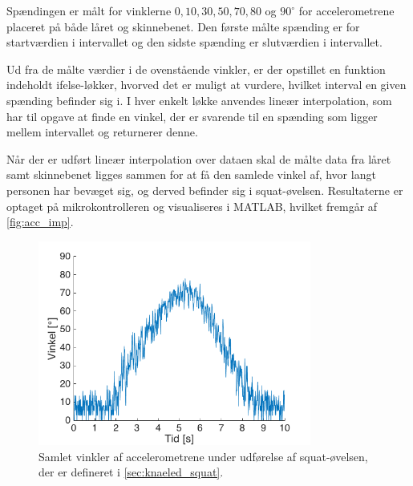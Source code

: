\noindent
Spændingen er målt for vinklerne $0, 10, 30, 50,70, 80$ og $90^{\circ}$ for accelerometrene placeret på både låret og skinnebenet. Den første målte spænding er for startværdien i intervallet og den sidste spænding er slutværdien i intervallet.

Ud fra de målte værdier i de ovenstående vinkler, er der opstillet en funktion indeholdt ifelse-løkker, hvorved det er muligt at vurdere, hvilket interval en given spænding befinder sig i. I hver enkelt løkke anvendes lineær interpolation, som har til opgave at finde en vinkel, der er svarende til en spænding som ligger mellem intervallet og returnerer denne. 

Når der er udført lineær interpolation over dataen skal de målte data fra låret samt skinnebenet ligges sammen for at få den samlede vinkel af, hvor langt personen har bevæget sig, og derved befinder sig i squat-øvelsen. Resultaterne er optaget på mikrokontrolleren og visualiseres i MATLAB, hvilket fremgår af \autoref{fig:acc_imp}.
 

\begin{figure}[H]
\centering
\includegraphics[width=0.8\textwidth]{figures/Pilotforsoeg/accvinkel}
\caption{Samlet vinkler af accelerometrene under udførelse af squat-øvelsen, der er defineret i \autoref{sec:knaeled_squat}.}
\label{fig:acc_imp}
\end{figure}



